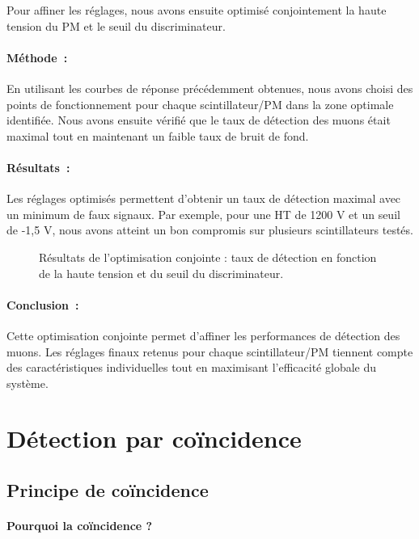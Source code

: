 \documentclass[a4paper,12pt,twoside]{article}
\begin{document}
Pour affiner les réglages, nous avons ensuite optimisé conjointement la haute tension du PM et le seuil du discriminateur.

\paragraph{Méthode :} En utilisant les courbes de réponse précédemment obtenues, nous avons choisi des points de fonctionnement pour chaque scintillateur/PM dans la zone optimale identifiée. Nous avons ensuite vérifié que le taux de détection des muons était maximal tout en maintenant un faible taux de bruit de fond.

\paragraph{Résultats :} Les réglages optimisés permettent d’obtenir un taux de détection maximal avec un minimum de faux signaux. Par exemple, pour une HT de 1200 V et un seuil de -1,5 V, nous avons atteint un bon compromis sur plusieurs scintillateurs testés.

\begin{figure}[H]
    \centering
    \caption{Résultats de l'optimisation conjointe : taux de détection en fonction de la haute tension et du seuil du discriminateur.}
\end{figure}

\paragraph{Conclusion :} Cette optimisation conjointe permet d’affiner les performances de détection des muons. Les réglages finaux retenus pour chaque scintillateur/PM tiennent compte des caractéristiques individuelles tout en maximisant l’efficacité globale du système.

\newpage

\section{Détection par coïncidence}
\subsection{Principe de coïncidence}

\paragraph{Pourquoi la coïncidence ?}
\end{document}

